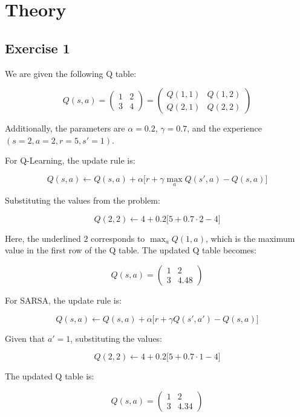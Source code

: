\chapter*{Theory}

\section*{Exercise 1}

We are given the following Q table:

\[
    Q(s,a) = 
    \begin{pmatrix}
        1 & 2   \\
        3 & 4 
    \end{pmatrix} =
    \begin{pmatrix}
        Q(1,1) & Q(1,2)   \\
        Q(2,1) & Q(2,2) 
    \end{pmatrix}
\]

Additionally, the parameters are $\alpha = 0.2$, $\gamma = 0.7$, and the experience $(s=2, a=2, r=5, s'=1)$.

For Q-Learning, the update rule is:

\[
    Q(s,a) \leftarrow Q(s,a) + \alpha \big[ r + \gamma \max_a Q(s',a) - Q(s,a) \big]
\]

Substituting the values from the problem:

\[
    Q(2,2) \leftarrow 4 + 0.2 \big[ 5 + 0.7 \cdot \underline{2} - 4 \big]
\]

Here, the underlined \(2\) corresponds to $\max_a Q(1,a)$, which is the maximum value in the first row of the Q table. The updated Q table becomes:

\[
    Q(s,a) = 
    \begin{pmatrix}
        1 & 2     \\
        3 & 4.48
    \end{pmatrix}
\]

For SARSA, the update rule is:

\[
    Q(s,a) \leftarrow Q(s,a) + \alpha \big[ r + \gamma Q(s',a') - Q(s,a) \big]
\]

Given that $a' = 1$, substituting the values:

\[
    Q(2,2) \leftarrow 4 + 0.2 \big[ 5 + 0.7 \cdot 1 - 4 \big]
\]

The updated Q table is:

\[
    Q(s,a) = 
    \begin{pmatrix}
        1 & 2     \\
        3 & 4.34
    \end{pmatrix}
\]

